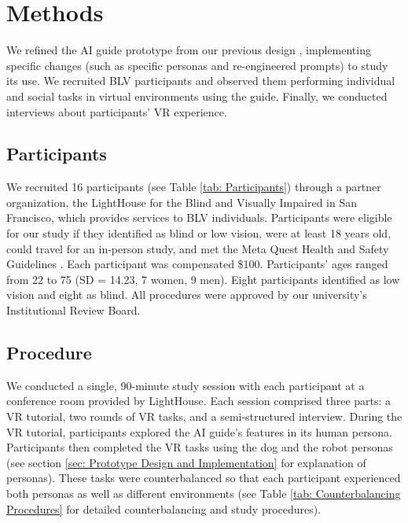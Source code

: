 \section{Methods}



We refined the AI guide prototype from our previous design \cite{collins2024ai}, implementing specific changes (such as specific personas and re-engineered prompts) to study its use. We recruited BLV participants and observed them performing individual and social tasks in virtual environments using the guide. Finally, we conducted interviews about participants’ VR experience.

\subsection{Participants}

We recruited 16 participants (see Table \ref{tab: Participants}) through a partner organization, the LightHouse for the Blind and Visually Impaired in San Francisco, which provides services to BLV individuals. Participants were eligible for our study if they identified as blind or low vision, were at least 18 years old, could travel for an in-person study, and met the Meta Quest Health and Safety Guidelines \cite{guidelines}. Each participant was compensated \$100. Participants’ ages ranged from 22 to 75 (SD = 14.23, 7 women, 9 men). Eight participants identified as low vision and eight as blind. All procedures were approved by our university’s Institutional Review Board.



\subsection{Procedure} \label{sec: Procedure}

We conducted a single, 90-minute study session with each participant at a conference room provided by LightHouse. Each session comprised three parts: a VR tutorial, two rounds of VR tasks, and a semi-structured interview. During the VR tutorial, participants explored the AI guide’s features in its human persona. Participants then completed the VR tasks using the dog and the robot personas (see section \ref{sec: Prototype Design and Implementation} for explanation of personas). These tasks were counterbalanced so that each participant experienced both personas as well as different environments (see Table \ref{tab: Counterbalancing Procedures} for detailed counterbalancing and study procedures).

